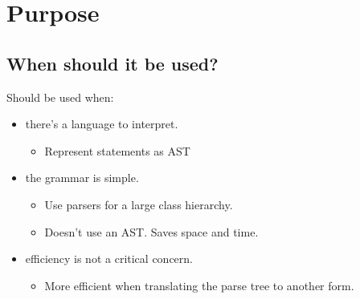 
\section{Purpose}

\subsection{When should it be used?}

Should be used when: 
\begin{itemize}
    \item there's a language to interpret.
    \begin{itemize}
        \item Represent statements as AST
    \end{itemize}

    \item the grammar is simple.
    \begin{itemize}
        \item Use parsers for a large class hierarchy.
        \item Doesn't use an AST. Saves space and time.
    \end{itemize}

    \item efficiency is not a critical concern.
    \begin{itemize}
        \item More efficient when translating the parse tree to another form.
    \end{itemize}
\end{itemize}

